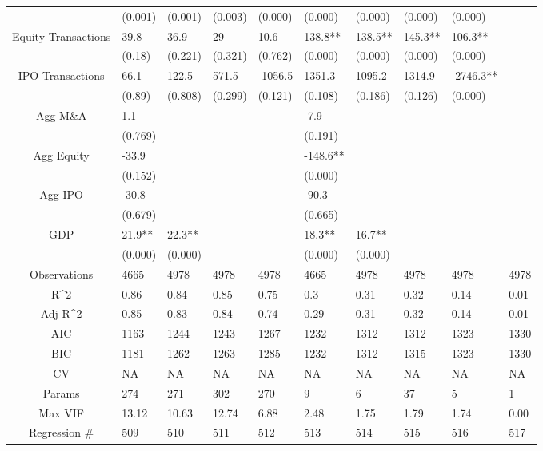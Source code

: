 \documentclass{article}
\begin{document}
\begin{table}[H]
\begin{tabular}{|clllllllll|}
   & (0.001) & (0.001) & (0.003) & (0.000) & (0.000) & (0.000) & (0.000) & (0.000) &  \\
  Equity Transactions & 39.8 & 36.9 & 29 & 10.6 & 138.8** & 138.5** & 145.3** & 106.3** &  \\
   & (0.18) & (0.221) & (0.321) & (0.762) & (0.000) & (0.000) & (0.000) & (0.000) &  \\
  IPO Transactions & 66.1 & 122.5 & 571.5 & -1056.5 & 1351.3 & 1095.2 & 1314.9 & -2746.3** &  \\
   & (0.89) & (0.808) & (0.299) & (0.121) & (0.108) & (0.186) & (0.126) & (0.000) &  \\
  Agg M\&A & 1.1 &  &  &  & -7.9 &  &  &  &  \\
   & (0.769) &  &  &  & (0.191) &  &  &  &  \\
  Agg Equity & -33.9 &  &  &  & -148.6** &  &  &  &  \\
   & (0.152) &  &  &  & (0.000) &  &  &  &  \\
  Agg IPO & -30.8 &  &  &  & -90.3 &  &  &  &  \\
   & (0.679) &  &  &  & (0.665) &  &  &  &  \\
  GDP & 21.9** & 22.3** &  &  & 18.3** & 16.7** &  &  &  \\
   & (0.000) & (0.000) &  &  & (0.000) & (0.000) &  &  &  \\
  \hline
 Observations & 4665 & 4978 & 4978 & 4978 & 4665 & 4978 & 4978 & 4978 & 4978 \\
  R^2 & 0.86 & 0.84 & 0.85 & 0.75 & 0.3 & 0.31 & 0.32 & 0.14 & 0.01 \\
  Adj R^2 & 0.85 & 0.83 & 0.84 & 0.74 & 0.29 & 0.31 & 0.32 & 0.14 & 0.01 \\
  AIC & 1163 & 1244 & 1243 & 1267 & 1232 & 1312 & 1312 & 1323 & 1330 \\
  BIC & 1181 & 1262 & 1263 & 1285 & 1232 & 1312 & 1315 & 1323 & 1330 \\
  CV & NA & NA & NA & NA & NA & NA & NA & NA & NA \\
  Params & 274 & 271 & 302 & 270 & 9 & 6 & 37 & 5 & 1 \\
  Max VIF & 13.12 & 10.63 & 12.74 & 6.88 & 2.48 & 1.75 & 1.79 & 1.74 & 0.00 \\
  Regression \# & 509 & 510 & 511 & 512 & 513 & 514 & 515 & 516 & 517 \\
   \hline
\end{tabular}

\end{table}
\end{document}
